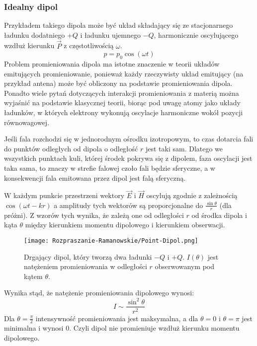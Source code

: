 \subsubsection{Idealny dipol}
Przykładem takiego dipola może być układ składający się ze stacjonarnego ładunku dodatniego $+Q$ i ładunku ujemnego $-Q$, harmonicznie oscylującego wzdłuż kierunku $\overrightarrow{P}$ z częstotliwością $\omega$.
\begin{equation}
	p = p_{0}\cos(\omega t)
\end{equation}
Problem promieniowania dipola ma istotne znaczenie w teorii układów emitujących promieniowanie, ponieważ każdy rzeczywisty układ emitujący (na przykład antena) może być obliczony na podstawie promieniowania dipola. Ponadto wiele pytań dotyczących interakcji promieniowania z materią można wyjaśnić na podstawie klasycznej teorii, biorąc pod uwagę atomy jako układy ładunków, w których elektrony wykonują oscylacje harmoniczne wokół pozycji równowagowej.

Jeśli fala rozchodzi się w jednorodnym ośrodku izotropowym, to czas dotarcia fali do punktów odległych od dipola o odległość $r$ jest taki sam. Dlatego we wszystkich punktach kuli, której środek pokrywa się z dipolem, faza oscylacji jest taka sama, to znaczy w strefie falowej czoło fali będzie sferyczne, a w konsekwencji fala emitowana przez dipol jest falą sferyczną.

W każdym punkcie przestrzeni wektory $\overrightarrow{E}$ i $\overrightarrow{H}$ oscylują zgodnie z zależnością $\cos(\omega t - kr)$ a amplitudy tych wektorów są proporcjonalne do
$\frac{\sin \theta}{r}$ (dla próżni). Z wzorów tych wynika, że zależą one od odległości $r$ od środka dipola i kąta $\theta$ między kierunkiem momentu dipolowego i kierunkiem obserwacji.
\begin{figure}[H]
	\begin{center}
		\texttt{[image: Rozpraszanie-Ramanowskie/Point-Dipol.png]}
		\caption{Drgający dipol, który tworzą dwa ładunki $-Q$ i $+Q$. $I(\theta)$ jest natężeniem promieniowania w odległości $r$ obserwowanym pod kątem $\theta$.}
	\end{center}
\end{figure}
Wynika stąd, że natężenie promieniowania dipolowego wynosi:
\begin{equation}
	I \sim \frac{\sin^{2}\theta}{r^{2}}
\end{equation}
Dla $\theta = \frac{\pi}{2}$ intensywność promieniowania jest maksymalna, a dla 
$\theta = 0$ i $\theta = \pi$ jest minimalna i wynosi $0$. Czyli dipol nie promieniuje wzdłuż kierunku momentu dipolowego.
